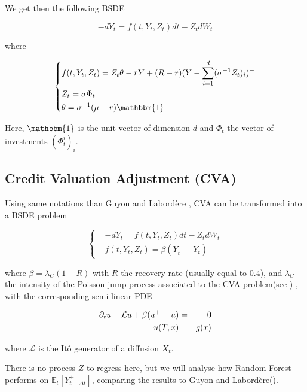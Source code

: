 \documentclass[english,11pt,openany]{report}
\theoremstyle{definition}
\newcommand{\E}{\mathbb{E}}
\theoremstyle{plain}
\theoremstyle{definition}
\begin{document}
We get then the following BSDE

\begin{equation}
-dY_t = f(t,Y_t,Z_t)dt - Z_tdW_t  
\end{equation}

where 

\begin{equation}
\left\{
\begin{aligned}
&f(t,Y_t,Z_t)  =   Z_t\theta - rY + (R-r)(Y- \sum_{i=1}^{d}(\sigma^{-1}Z_t)_i)^-\\
&Z_t  = \sigma\Phi_t\\
&\theta = \sigma^{-1}(\mu - r)\mathbbm{1}
\end{aligned}
\right.
\end{equation}

Here, $\mathbbm{1}$ is the unit vector of dimension $d$ and $\Phi_t$ the vector of investments $\left(\Phi^i_t\right)_i$.

\subsection{Credit Valuation Adjustment (CVA)}

Using same notations than Guyon and Labordère \cite{GuyonLabordere:cva}, CVA can be transformed into a BSDE problem

\begin{displaymath}
\left\{
\begin{aligned}
&-dY_t = f(t,Y_t,Z_t)dt - Z_tdW_t \\
&f(t,Y_t,Z_t)  =  \beta (Y_t^+ - Y_t)
\end{aligned}
\right.
\end{displaymath}

where $\beta = \lambda_C(1 - R)$ with $R$ the recovery rate (usually equal to 0.4), and $\lambda_C$ the intensity of the Poisson jump process associated to the CVA problem(see \cite{GuyonLabordere:cva}) ,
with the corresponding semi-linear PDE 

\begin{eqnarray}
\partial_t u + \mathcal{L}u + \beta(u^+ -u) &=& 0 \notag \\
u(T, x) &=& g(x) \notag
\end{eqnarray}

where $\mathcal{L}$ is the Itô generator of a diffusion $X_t$.

There is no process $Z$ to regress here, but we will analyse how Random Forest performs on $\E_t[Y_{t+ \Delta t}^+]$, comparing the results to Guyon and Labordère(\cite{GuyonLabordere:cva}). 
\end{document}
